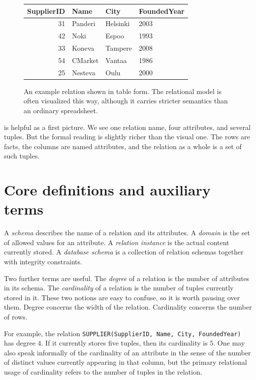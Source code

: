\documentclass[11pt,a4paper,openany]{book}
\begin{document}
\begin{figure}[tbp]
\centering
\begin{tabular}{@{}rlll@{}}
\toprule
\textbf{SupplierID} & \textbf{Name} & \textbf{City} & \textbf{FoundedYear}\\
\midrule
31 & Panderi & Helsinki & 2003\\
42 & Noki & Espoo & 1993\\
33 & Koneva & Tampere & 2008\\
54 & CMarket & Vantaa & 1986\\
25 & Nesteva & Oulu & 2000\\
\bottomrule
\end{tabular}
\caption{An example relation shown in table form. The relational model is often visualized this way, although it carries stricter semantics than an ordinary spreadsheet.}
\label{fig:rel-supplier-example}
\end{figure}

 is helpful as a first picture. We see one relation name, four attributes, and several tuples. But the formal reading is slightly richer than the visual one. The rows are facts, the columns are named attributes, and the relation as a whole is a set of such tuples.

\section{Core definitions and auxiliary terms}
A \emph{schema} describes the name of a relation and its attributes. A \emph{domain} is the set of allowed values for an attribute. A \emph{relation instance} is the actual content currently stored. A \emph{database schema} is a collection of relation schemas together with integrity constraints.

Two further terms are useful. The \emph{degree} of a relation is the number of attributes in its schema. The \emph{cardinality} of a relation is the number of tuples currently stored in it. These two notions are easy to confuse, so it is worth pausing over them. Degree concerns the width of the relation. Cardinality concerns the number of rows.

For example, the relation \texttt{SUPPLIER(SupplierID, Name, City, FoundedYear)} has degree \(4\). If it currently stores five tuples, then its cardinality is \(5\). One may also speak informally of the cardinality of an attribute in the sense of the number of distinct values currently appearing in that column, but the primary relational usage of cardinality refers to the number of tuples in the relation.
\end{document}
